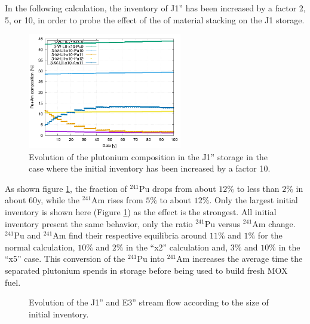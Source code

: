 \documentclass[12pt]{article}
\begin{document}
In the following calculation, the inventory of J1'' has been increased by a
factor 2, 5, or 10, in order to probe the effect of the of material stacking on
the J1 storage.

\begin{figure}[h!]
  \centering
  \includegraphics[width=0.6\textwidth]  {img/C_1_3_W_LII_x10_pu_composition}
  \caption{Evolution of the plutonium composition in the J1'' storage in the
  case where the initial inventory has been increased by a factor 10.}
  \label{fig:LII_compo_x10}
\end{figure}

As shown figure \ref{fig:LII_compo_x10}, the fraction of $^{241}$Pu drops from
about $12\%$ to less than $2\%$ in about 60y, while the $^{241}$Am rises from
$5\%$ to about $12\%$. Only the largest initial inventory is shown here (Figure
\ref{fig:LII_compo_x10}) as the effect is the strongest. All initial inventory
present the same behavior, only the ratio $^{241}$Pu versus $^{241}$Am change.
$^{241}$Pu and $^{241}$Am find their respective equilibria around $11\%$ and
$1\%$ for the normal calculation, $10\%$ and $2\%$ in the ``x2'' calculation
and, $3\%$ and $10\%$ in the ``x5'' case. This conversion of the $^{241}$Pu into
$^{241}$Am increases the average time the separated plutonium spends in storage
before being used to build fresh MOX fuel.

\begin{figure}[h!]
  \centering
  

  \caption{ Evolution of the J1'' and E3'' stream flow according to the size
    of initial inventory. \label{fig:LII} } 
  \end{figure}
\end{document}
